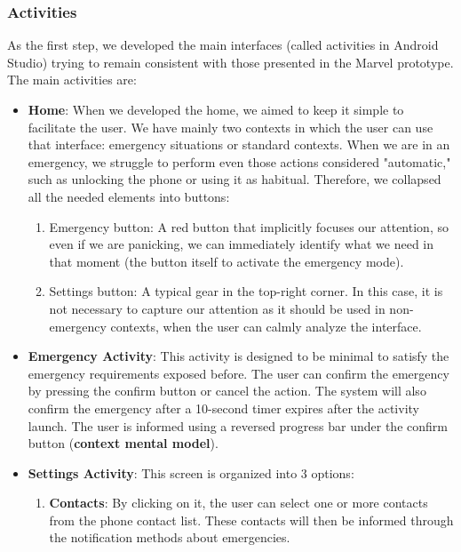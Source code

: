 \documentclass[12pt]{article}
\begin{document}
\subsubsection{Activities}
As the first step, we developed the main interfaces (called activities 
in Android Studio) trying to remain consistent with those presented in 
the Marvel prototype. The main activities are:
\begin{itemize}
    \item \textbf{Home}: When we developed the home, we aimed to keep it 
    simple to facilitate the user. We have mainly two contexts in which 
    the user can use that interface: emergency situations or standard 
    contexts. When we are in an emergency, we struggle to perform even 
    those actions considered "automatic," such as unlocking the phone or 
    using it as habitual. Therefore, we collapsed all the needed elements 
    into buttons:
    \begin{enumerate}
        \item Emergency button: A red button that implicitly focuses our 
        attention, so even if we are panicking, we can immediately 
        identify what we need in that moment (the button itself to 
        activate the emergency mode).
        \item Settings button: A typical gear in the top-right corner. In 
        this case, it is not necessary to capture our attention as it 
        should be used in non-emergency contexts, when the user can calmly 
        analyze the interface.
    \end{enumerate} 
    \item \textbf{Emergency Activity}: This activity is designed to be 
    minimal to satisfy the emergency requirements exposed before. The 
    user can confirm the emergency by pressing the confirm button or 
    cancel the action. The system will also confirm the emergency after 
    a 10-second timer expires after the activity launch. The user is 
    informed using a reversed progress bar under the confirm button 
    (\textbf{context mental model}).
    \item \textbf{Settings Activity}: This screen is organized into 3 
    options:
    \begin{enumerate}
        \item \textbf{Contacts}: By clicking on it, the user can select 
        one or more contacts from the phone contact list. These contacts 
        will then be informed through the notification methods about 
        emergencies.

\end{enumerate}
\end{itemize}
\end{document}
